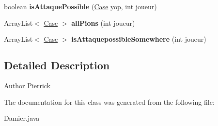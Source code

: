 \begin{DoxyCompactItemize}
\item 
boolean {\bfseries is\+Attaque\+Possible} (\hyperlink{class_case}{Case} yop, int joueur)\hypertarget{class_damier_a28e1257dd6bed520d005a0eed97111f3}{}\label{class_damier_a28e1257dd6bed520d005a0eed97111f3}

\item 
Array\+List$<$ \hyperlink{class_case}{Case} $>$ {\bfseries all\+Pions} (int joueur)\hypertarget{class_damier_acc78f205170c7862ebb453db663ccb1e}{}\label{class_damier_acc78f205170c7862ebb453db663ccb1e}

\item 
Array\+List$<$ \hyperlink{class_case}{Case} $>$ {\bfseries is\+Attaquepossible\+Somewhere} (int joueur)\hypertarget{class_damier_a4b6ed4ba50b7d3ed5a4a880e7f9a256b}{}\label{class_damier_a4b6ed4ba50b7d3ed5a4a880e7f9a256b}

\end{DoxyCompactItemize}


\subsection{Detailed Description}
\begin{DoxyAuthor}{Author}
Pierrick 
\end{DoxyAuthor}


The documentation for this class was generated from the following file\+:\begin{DoxyCompactItemize}
\item 
Damier.\+java\end{DoxyCompactItemize}
